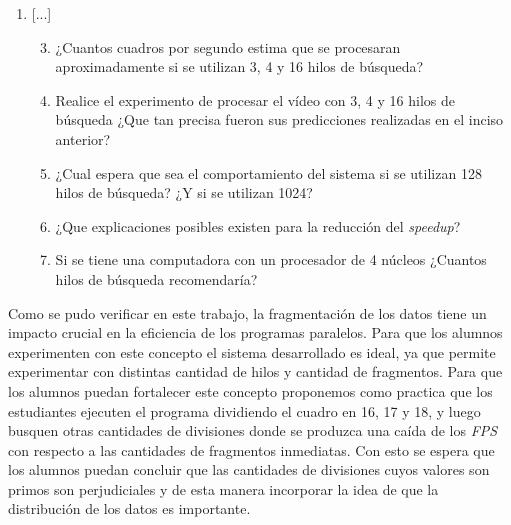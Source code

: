 \begin{enumerate}

	\item{[...]

\begin{enumerate}

	\setcounter{enumii}{2}

	\item{¿Cuantos cuadros por segundo estima que se procesaran
		aproximadamente si se utilizan 3, 4 y 16 hilos de búsqueda?}

	\item{Realice el experimento de procesar el vídeo con 3, 4 y 16 hilos de
		búsqueda ¿Que tan precisa fueron sus predicciones realizadas en
		el inciso anterior?}

	\item{¿Cual espera que sea el comportamiento del sistema si se utilizan
		128 hilos de búsqueda? ¿Y si se utilizan 1024?}

	\item{¿Que explicaciones posibles existen para la reducción del
		\emph{speedup}?}

	\item{Si se tiene una computadora con un procesador de 4 núcleos
		¿Cuantos hilos de búsqueda recomendaría?}

\end{enumerate}}

\end{enumerate}

Como se pudo verificar en este trabajo, la fragmentación de los datos tiene un
impacto crucial en la eficiencia de los programas paralelos. Para que los
alumnos experimenten con este concepto el sistema desarrollado es ideal, ya que
permite experimentar con distintas cantidad de hilos y cantidad de fragmentos.
Para que los alumnos puedan fortalecer este concepto proponemos como practica
que los estudiantes ejecuten el programa dividiendo el cuadro en 16, 17 y 18, y
luego busquen otras cantidades de divisiones donde se produzca una caída de los
\emph{FPS} con respecto a las cantidades de fragmentos inmediatas. Con esto se
espera que los alumnos puedan concluir que las cantidades de divisiones cuyos
valores son primos son perjudiciales y de esta manera incorporar la idea de que
la distribución de los datos es importante.

